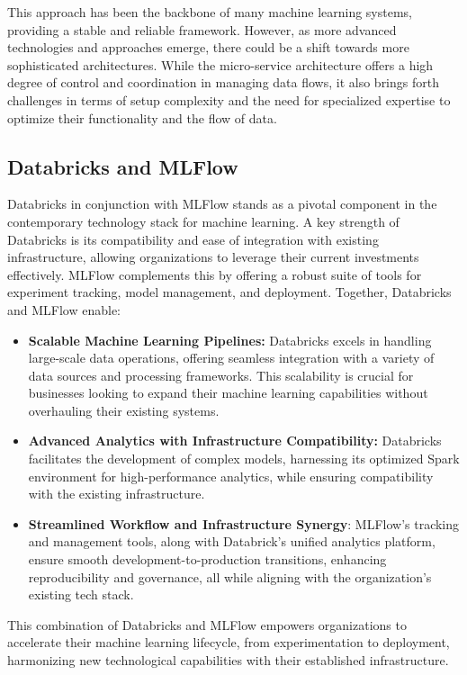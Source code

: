 This approach has been the backbone of many machine learning systems, providing a stable and reliable framework. However, as more advanced technologies and approaches emerge, there could be a shift towards more sophisticated architectures. While the micro-service architecture offers a high degree of control and coordination in managing data flows, it also brings forth challenges in terms of setup complexity and the need for specialized expertise to optimize their functionality and the flow of data.

\subsection{Databricks and MLFlow}

Databricks \cite{databricks_website} in conjunction with MLFlow \cite{MLflowWeb} stands as a pivotal component in the contemporary technology stack for machine learning. A key strength of Databricks is its compatibility and ease of integration with existing infrastructure, allowing organizations to leverage their current investments effectively. MLFlow complements this by offering a robust suite of tools for experiment tracking, model management, and deployment. Together, Databricks and MLFlow enable:

\begin{itemize}
    \item \textbf{Scalable Machine Learning Pipelines:} Databricks excels in handling large-scale data operations, offering seamless integration with a variety of data sources and processing frameworks. This scalability is crucial for businesses looking to expand their machine learning capabilities without overhauling their existing systems.
    \item \textbf{Advanced Analytics with Infrastructure Compatibility:} Databricks facilitates the development of complex models, harnessing its optimized Spark \cite{ApacheSpark} environment for high-performance analytics, while ensuring compatibility with the existing infrastructure.
    \item \textbf{Streamlined Workflow and Infrastructure Synergy}: MLFlow's tracking and management tools, along with Databrick's unified analytics platform, ensure smooth development-to-production transitions, enhancing reproducibility and governance, all while aligning with the organization's existing tech stack.
\end{itemize}

This combination of Databricks and MLFlow empowers organizations to accelerate their machine learning lifecycle, from experimentation to deployment, harmonizing new technological capabilities with their established infrastructure.

